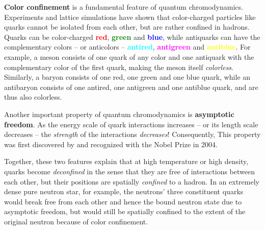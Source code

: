 \begin{figure}
\centering
{}
\caption{\label{fig:lsm:confinement}%
}
\end{figure}

\textbf{Color confinement} is a fundamental feature of quantum chromodynamics.
Experiments and lattice simulations have shown that color-charged particles like quarks cannot be isolated from each other, but are rather confined in hadrons.
Quarks can be color-charged \textcolor{red}{\textbf{red}}, \textcolor{green}{\textbf{green}} and \textcolor{blue}{\textbf{blue}},
while antiquarks can have the complementary colors -- or anticolors -- \textcolor{cyan}{\textbf{antired}}, \textcolor{magenta}{\textbf{antigreen}} and \textcolor{yellow}{\textbf{antiblue}}.
For example, a meson consists of one quark of any color and one antiquark with the complementary color of the first quark, making the meson itself \emph{colorless}.
Similarly, a baryon consists of one red, one green and one blue quark,
while an antibaryon consists of one antired, one antigreen and one antiblue quark,
and are thus also colorless.

Another important property of quantum chromodynamics is \textbf{asymptotic freedom}.
As the energy scale of quark interactions increases -- or its length scale decreases -- the \emph{strength} of the interactions \emph{decreases}!
Consequently, 
This property was first discovered by \cite{ref:asymptotic_freedom_gross_wilczek,ref:asymptotic_freedom_politzer} and recognized with the Nobel Prize in 2004.

Together, these two features explain that at high temperature or high density,
quarks become \emph{deconfined} in the sense that they are free of interactions between each other,
but their positions are spatially \emph{confined} to a hadron.
In an extremely dense pure neutron star, for example,
the neutrons' three constituent quarks would break free from each other and hence the bound neutron state due to asymptotic freedom,
but would still be spatially confined to the extent of the original neutron because of color confinement.

